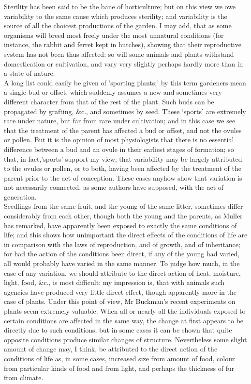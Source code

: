 \indent Sterility has been said to be the bane of horticulture; but on this view we owe variability to the same cause which produces sterility; and variability is the source of all the choicest productions of the garden. I may add, that as some organisms will breed most freely under the most unnatural conditions (for instance, the rabbit and ferret kept in hutches), showing that their reproductive system has not been thus affected; so will some animals and plants withstand domestication or cultivation, and vary very slightly perhaps hardly more than in a state of nature.  \\
\indent A long list could easily be given of 'sporting plants;' by this term gardeners mean a single bud or offset, which suddenly assumes a new and sometimes very different character from that of the rest of the plant. Such buds can be propagated by grafting, \&c., and sometimes by seed.  These `sports' are extremely rare under nature, but far from rare under cultivation; and in this case we see that the treatment of the parent has affected a bud or offset, and not the ovules or pollen. But it is the opinion of most physiologists that there is no essential difference between a bud and an ovule in their earliest stages of formation; so that, in fact,'sports' support my view, that variability may be largely attributed to the ovules or pollen, or to both, having been affected by the treatment of the parent prior to the act of conception. These cases anyhow show that variation is not necessarily connected, as some authors have supposed, with the act of generation.  \\
\indent Seedlings from the same fruit, and the young of the same litter, sometimes differ considerably from each other, though both the young and the parents, as Muller has remarked, have apparently been exposed to exactly the same conditions of life; and this shows how unimportant the direct effects of the conditions of life are in comparison with the laws of reproduction, and of growth, and of inheritance; for had the action of the conditions been direct, if any of the young had varied, all would probably have varied in the same manner. To judge how much, in the case of any variation, we should attribute to the direct action of heat, moisture, light, food, \&c., is most difficult: my impression is, that with animals such agencies have produced very little direct effect, though apparently more in the case of plants. Under this point of view, Mr Buckman's recent experiments on plants seem extremely valuable. When all or nearly all the individuals exposed to certain conditions are affected in the same way, the change at first appears to be directly due to such conditions; but in some cases it can be shown that quite opposite conditions produce similar changes of structure. Nevertheless some slight amount of change may, I think, be attributed to the direct action of the conditions of life as, in some cases, increased size from amount of food, colour from particular kinds of food and from light, and perhaps the thickness of fur from climate.  \\

